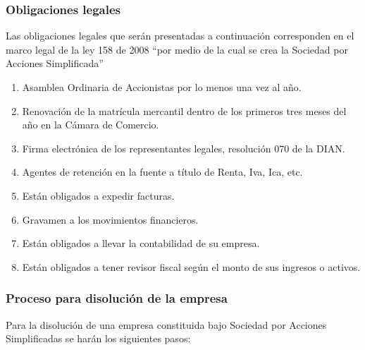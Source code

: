 \subsubsection*{Obligaciones legales}

Las obligaciones legales que serán presentadas a continuación corresponden en el marco legal de la ley 158 de 2008 “por medio de la cual se crea la Sociedad por Acciones Simplificada”

\begin{enumerate}
    \item Asamblea Ordinaria de Accionistas por lo menos una vez al año.
    \item Renovación de la matrícula mercantil dentro de los primeros tres meses del año en la Cámara de Comercio.
    \item Firma electrónica de los representantes legales, resolución 070 de la DIAN.
    \item Agentes de retención en la fuente a título de Renta, Iva, Ica, etc.
    \item Están obligados a expedir facturas.
    \item Gravamen a los movimientos financieros.
    \item Están obligados a llevar la contabilidad de su empresa.
    \item Están obligados a tener revisor fiscal según el monto de sus ingresos o activos.
\end{enumerate}

\subsubsection*{Proceso para disolución de la empresa}

Para la disolución de una empresa constituida bajo Sociedad por Acciones Simplificadas se harán los siguientes pasos:

